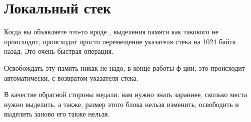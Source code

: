 ﻿\section{Локальный стек}

Когда вы объявляете что-то вроде , выделения памяти как такового не происходит, происходит
просто перемещение указателя стека на 1024 байта назад\cite[1.2.3]{REBook}. Это очень быстрая операция.

Освобождать эту память никак не надо, в конце работы ф-ции, это происходит автоматически, с возвратом указателя стека.

В качестве обратной стороны медали, вам нужно знать зараннее, сколько места нужно выделить, а также, размер
этого блока нельзя изменить, освободить и выделить заново его также нельзя.
